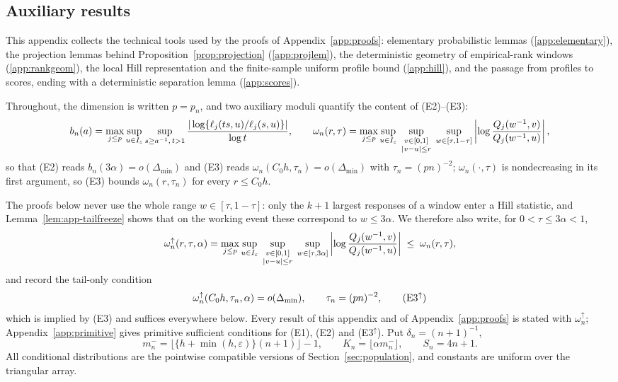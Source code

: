 \documentclass[bj,authoryear]{imsart}
\theoremstyle{plain}
\begin{document}
\begin{appendix}
\section{Auxiliary results}
\label{app:aux}
\renewcommand{\theequation}{A.\arabic{equation}}
\setcounter{equation}{0}

This appendix collects the technical tools used by the proofs of
Appendix~\ref{app:proofs}: elementary probabilistic lemmas
(\ref{app:elementary}), the projection lemmas behind
Proposition~\ref{prop:projection} (\ref{app:projlem}), the deterministic
geometry of empirical-rank windows (\ref{app:rankgeom}), the local Hill
representation and the finite-sample uniform profile bound
(\ref{app:hill}), and the passage from profiles to scores, ending with a
deterministic separation lemma (\ref{app:scores}).

Throughout, the dimension is written $p=p_n$, and two auxiliary moduli
quantify the content of (E2)--(E3):
\[
 b_n(a)=\max_{j\le p}\sup_{u\in I_\varepsilon}\sup_{s\ge a^{-1},\,t>1}
 \frac{|\log\{\ell_j(ts,u)/\ell_j(s,u)\}|}{\log t},
 \qquad
 \omega_n(r,\tau)=\max_{j\le p}
 \sup_{u\in I_\varepsilon}\;
 \sup_{\substack{v\in[0,1]\\|v-u|\le r}}\;
 \sup_{w\in[\tau,1-\tau]}
 \left|\log\frac{Q_j(w^{-1},v)}{Q_j(w^{-1},u)}\right|,
\]
so that (E2) reads $b_n(3\alpha)=o(\Delta_{\min})$ and (E3) reads
$\omega_n(C_0h,\tau_n)=o(\Delta_{\min})$ with $\tau_n=(pn)^{-2}$;
$\omega_n(\cdot,\tau)$ is nondecreasing in its first argument, so (E3)
bounds $\omega_n(r,\tau_n)$ for every $r\le C_0h$.

The proofs below never use the whole range $w\in[\tau,1-\tau]$: only the
$k+1$ largest responses of a window enter a Hill statistic, and
Lemma~\ref{lem:app-tailfreeze} shows that on the working event these
correspond to $w\le3\alpha$.  We therefore also write, for
$0<\tau\le3\alpha<1$,
\begin{equation}\label{eq:omega-up}
 \omega_n^{\uparrow}(r,\tau,\alpha)=\max_{j\le p}
 \sup_{u\in I_\varepsilon}\;
 \sup_{\substack{v\in[0,1]\\|v-u|\le r}}\;
 \sup_{w\in[\tau,3\alpha]}
 \left|\log\frac{Q_j(w^{-1},v)}{Q_j(w^{-1},u)}\right|
 \;\le\;\omega_n(r,\tau),
\end{equation}
and record the tail-only condition
\begin{equation}\label{eq:E3up}
 \omega_n^{\uparrow}(C_0h,\tau_n,\alpha)=o(\Delta_{\min}),
 \qquad\tau_n=(pn)^{-2},
 \tag{E3$^{\uparrow}$}
\end{equation}
which is implied by (E3) and suffices everywhere below.  Every result of
this appendix and of Appendix~\ref{app:proofs} is stated with
$\omega_n^{\uparrow}$; Appendix~\ref{app:primitive} gives primitive
sufficient conditions for (E1), (E2) and (E3$^{\uparrow}$).  Put
$\delta_n=(n+1)^{-1}$,
\[
 m_n^-=\bigl\lfloor\{h+\min(h,\varepsilon)\}(n+1)\bigr\rfloor-1,
 \qquad
 K_n=\lfloor\alpha m_n^-\rfloor,
 \qquad
 S_n=4n+1.
\]
All conditional distributions are the pointwise compatible versions of
Section~\ref{sec:population}, and constants are uniform over the
triangular array.


\end{appendix}
\end{document}
